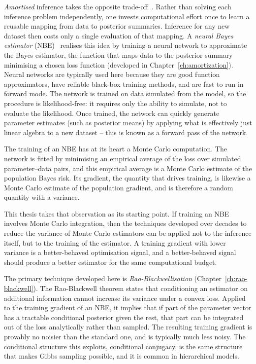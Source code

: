 \emph{Amortised} inference takes the opposite trade-off~\citep{zammitmangion2025neural}. Rather than
solving each inference problem independently, one invests
computational effort once to learn a reusable mapping from
data to posterior summaries. Inference for any new dataset then costs
only a single evaluation of that mapping. A \emph{neural Bayes
estimator} (NBE)~\citep{sainsburydale2024nbe} realises this idea by training
a neural network to approximate the Bayes estimator, the function
that maps data to the posterior summary minimising a chosen loss
function (developed in Chapter~\ref{ch:amortization}). Neural networks are typically used here because they are good function approximators, have reliable black-box training methods, and are fast to run in forward mode. The
network is trained on data simulated from the model, so the procedure
is likelihood-free: it requires only the ability to simulate, not to
evaluate the likelihood. Once trained, the network can quickly generate parameter estimates (such as posterior means) by applying what is effectively just linear algebra to a new dataset -- this is known as a forward pass of the network.

The training of an NBE has at its heart a Monte Carlo
computation. The network is fitted by minimising an empirical average
of the loss over simulated parameter--data pairs, and this empirical
average is a Monte Carlo estimate of the population Bayes risk. Its
gradient, the quantity that drives training, is likewise a Monte
Carlo estimate of the population gradient, and is therefore a random
quantity with a variance.

This thesis takes that observation as its starting point. If training
an NBE involves Monte Carlo integration, then the
techniques developed over decades to reduce the variance of Monte
Carlo estimators can be applied not to the inference itself, but to the
training of the estimator. A training gradient with lower
variance is a better-behaved optimisation signal, and a better-behaved
signal should produce a better estimator for the same computational
budget.

The primary technique developed here is \emph{Rao-Blackwellisation} (Chapter~\ref{ch:rao-blackwell}). The Rao-Blackwell theorem states that conditioning an estimator on
additional information cannot increase its variance under a convex
loss. Applied to the training gradient of an NBE, it
implies that if part of the parameter vector has a tractable
conditional posterior given the rest, that part can be integrated
out of the loss analytically rather than sampled. The resulting
training gradient is provably no noisier than the standard one, and is
typically much less noisy. The conditional structure this exploits,
conditional conjugacy, is the same structure that makes Gibbs
sampling possible, and it is common in hierarchical models.

